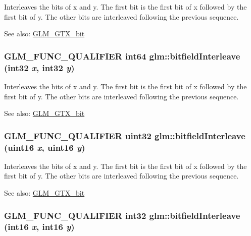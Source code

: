 Interleaves the bits of x and y. The first bit is the first bit of x followed by the first bit of y. The other bits are interleaved following the previous sequence.

\begin{Desc}
\item[See also:]\hyperlink{group__gtx__bit}{GLM\_\-GTX\_\-bit} \end{Desc}
\hypertarget{group__gtx__bit_g0de51d5985e6a703f305a5a61479babd}{
\subsubsection[bitfieldInterleave]{\setlength{\rightskip}{0pt plus 5cm}GLM\_\-FUNC\_\-QUALIFIER int64 glm::bitfieldInterleave (int32 {\em x}, \/  int32 {\em y})}}
\label{group__gtx__bit_g0de51d5985e6a703f305a5a61479babd}


Interleaves the bits of x and y. The first bit is the first bit of x followed by the first bit of y. The other bits are interleaved following the previous sequence.

\begin{Desc}
\item[See also:]\hyperlink{group__gtx__bit}{GLM\_\-GTX\_\-bit} \end{Desc}
\hypertarget{group__gtx__bit_g19ef8360379483e3ee245e89cb62ff93}{
\subsubsection[bitfieldInterleave]{\setlength{\rightskip}{0pt plus 5cm}GLM\_\-FUNC\_\-QUALIFIER uint32 glm::bitfieldInterleave (uint16 {\em x}, \/  uint16 {\em y})}}
\label{group__gtx__bit_g19ef8360379483e3ee245e89cb62ff93}


Interleaves the bits of x and y. The first bit is the first bit of x followed by the first bit of y. The other bits are interleaved following the previous sequence.

\begin{Desc}
\item[See also:]\hyperlink{group__gtx__bit}{GLM\_\-GTX\_\-bit} \end{Desc}
\hypertarget{group__gtx__bit_g1a0264598647ae00a596865af4e1e878}{
\subsubsection[bitfieldInterleave]{\setlength{\rightskip}{0pt plus 5cm}GLM\_\-FUNC\_\-QUALIFIER int32 glm::bitfieldInterleave (int16 {\em x}, \/  int16 {\em y})}}
\label{group__gtx__bit_g1a0264598647ae00a596865af4e1e878}


